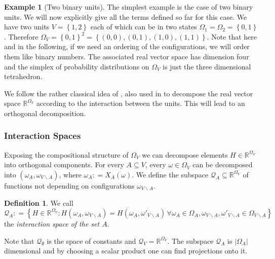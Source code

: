 \documentclass[12pt]{amsart}
\newcommand{\set}[1]{\left\lbrace #1 \right\rbrace} %
\newcommand{\defas}{\mathrel{\mathop{:}}=}   %
\renewcommand{\subset}{\subseteq}  %
\newcommand{\comment}[1]{ }
\newcommand{\ie}{i.e.\;}  %
\theoremstyle{plain}%
\theoremstyle{definition}
\newtheorem{defn}[thm]{Definition}
\newtheorem{exmp}[thm]{Example}
\theoremstyle{remark}
\begin{document}
\begin{exmp}[Two binary units]
\label{sec:twobinaryunitsexample}
The simplest example is the case of two binary units. We will now
explicitly give all the terms defined so far for this case. We have
two units $V = \set{1,2}$ each of which can be in two states $\Omega_1
= \Omega_2 = \set{0,1}$. Therefore $\Omega_V = \set{0,1}^2 =
\set{(0,0),(0,1),(1,0),(1,1)}$. Note that here and in the following,
if we need an ordering of the configurations, we will order them like
binary numbers. The associated real vector space has dimension four
and the simplex of probability distributions on $\Omega_V$ is just the
three dimensional tetrahedron.
\end{exmp}

We follow the rather classical idea of \cite{darrochspeed83}, also
used in \cite{lauritzen96,ayknauf06} to decompose the real vector
space $\mathbb{R}^{\Omega_V}$ according to the interaction between the
units. This will lead to an orthogonal decomposition.

\comment{

The full configuration space $\Omega_V$ of our system has a
composite structure. We want to decompose As an example one could ask
for the set of probability measures where never more than two units
interact (\ie there is a statistical dependence between the units). It
will turn out that it is given by an exponential family based on a
certain subspace which we will construct next.

In this work we clarify the role of this subspaces and add useful
tools to the theory by explicitly giving a basis for the case of
binary units.
}

\subsubsection{Interaction Spaces}
\label{sec:orth-decomp-of-ROMEGAV}
Exposing the compositional structure of $\Omega_V$ we can decompose
elements $H \in \mathbb{R}^{\Omega_V}$ into orthogonal components. For
every $A\subset V$, every $\omega \in \Omega_V$ can be decomposed into
$(\omega_A,\omega_{V\backslash A})$, where $\omega_A \defas X_A(\omega)$.  We define the subspace
$\mathcal{Q}_A \subset \mathbb{R}^{\Omega_V}$ of functions not
depending on configurations $\omega_{V\backslash A}$.
\begin{defn} We call 
  \begin{equation*}
  \label{eq:definitionsinteractionsubspace}
  \mathcal{Q}_A \defas \set{H\in \mathbb{R}^{\Omega_V} :
    H(\omega_A,\omega_{V\backslash A}) =  H(\omega_A,\omega'_{V\backslash A}) 
    \,\forall \omega_A \in \Omega_A, \omega_{V\backslash A},\omega'_{V\backslash A} \in \Omega_{V \backslash A} }
\end{equation*} the \emph{interaction space of the set $A$}. 
\end{defn}
Note that $\mathcal{Q}_\emptyset$ is the space of constants and
$\mathcal{Q}_V = \mathbb{R}^{\Omega_V}$. The subspace $\mathcal{Q}_A$
is $\vert \Omega_A \vert$ dimensional and by choosing a scalar product
one can find projections onto it. 
\end{document}
